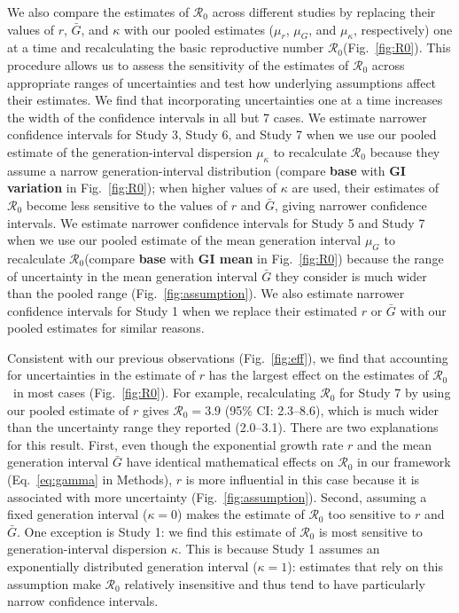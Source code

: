 \documentclass[12pt]{article}
\newcommand{\eref}[1]{Eq.~\ref{eq:#1}}
\newcommand{\fref}[1]{Fig.~\ref{fig:#1}}
\newcommand{\Ro}{\ensuremath{{\mathcal R}_{0}}\xspace}
\begin{document}
We also compare the estimates of \Ro across different studies by 
replacing their values of $r$, $\bar G$, and $\kappa$ with our pooled estimates ($\mu_r$, $\mu_G$, and $\mu_\kappa$, respectively) one at a time and recalculating the basic reproductive number \Ro (\fref{R0}).
This procedure allows us to assess the sensitivity of the estimates of \Ro across appropriate ranges of uncertainties and test how underlying assumptions affect their estimates.
We find that incorporating uncertainties one at a time increases the width of the confidence intervals in all but 7 cases.
We estimate narrower confidence intervals for Study 3, Study 6, and Study 7 when we use our pooled estimate of the generation-interval dispersion $\mu_\kappa$ to recalculate \Ro because they assume a narrow generation-interval distribution (compare \textbf{base} with \textbf{GI variation} in \fref{R0});
when higher values of $\kappa$ are used, their estimates of \Ro become less sensitive to the values of $r$ and $\bar G$, giving narrower confidence intervals.
We estimate narrower confidence intervals for Study 5 and Study 7 when we use our pooled estimate of the mean generation interval $\mu_G$ to recalculate \Ro (compare \textbf{base} with \textbf{GI mean} in \fref{R0}) because the range of uncertainty in the mean generation interval $\bar G$ they consider is much wider than the pooled range (\fref{assumption}).
We also estimate narrower confidence intervals for Study 1 when we replace their estimated $r$ or $\bar G$ with our pooled estimates for similar reasons.

Consistent with our previous observations (\fref{eff}),
we find that accounting for uncertainties in the estimate of $r$ has the largest effect on the estimates of \Ro\ in most cases (\fref{R0}).
For example, recalculating \Ro for Study 7 by using our pooled estimate of $r$ gives $\Ro = 3.9$ (95\% CI: 2.3--8.6), which is much wider than the uncertainty range they reported (2.0--3.1).
There are two explanations for this result.
First, even though the exponential growth rate $r$ and the mean generation interval $\bar G$ have identical mathematical effects on \Ro in our framework (\eref{gamma} in Methods),
$r$ is more influential in this case because it is associated with more uncertainty (\fref{assumption}).
Second, assuming a fixed generation interval ($\kappa=0$) makes the estimate of \Ro too sensitive to $r$ and $\bar G$.
One exception is Study 1: we find this estimate of \Ro is most sensitive to generation-interval dispersion $\kappa$.
This is because Study 1 assumes an exponentially distributed generation interval ($\kappa=1$): estimates that rely on this assumption make \Ro relatively insensitive and thus tend to have particularly narrow confidence intervals.
\end{document}
